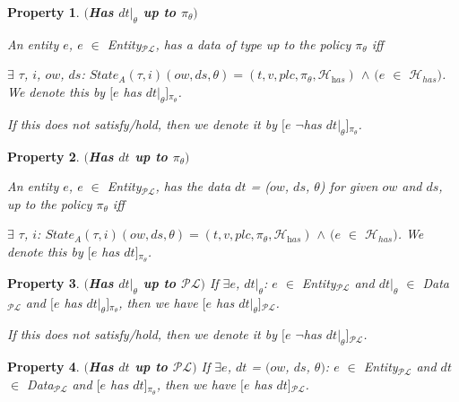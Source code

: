 \documentclass[a4paper]{article}
\newtheorem{ttp}{Property}
\begin{document}
\begin{ttp}\label{prop:has1}\textbf{$($Has $dt|_{\theta}$ up to $\pi_{\theta}$$)$}

An entity $e$, $e$ $\in$ \textit{Entity}$_{\mathcal{P}\mathcal{L}}$, has a data of type up to  the policy $\pi_{\theta}$ iff 

$\exists$ $\tau$, $i$, $ow$, $ds$: $\textit{State}_A(\tau, i)(ow, ds, \theta) = (t, v, \textit{plc}, \pi_{\theta}, \mathcal{H}_{\textit{has}})$ $\wedge$ $(e$ $\in$ $\mathcal{H}_{has})$. We denote this by $[e$ has $dt|_{\theta}]$$_{\pi_{\theta}}$. 

If this does not satisfy/hold, then we denote it by $[e$ $\neg$has $dt|_{\theta}]$$_{\pi_{\theta}}$. 
\end{ttp}

\begin{ttp}\label{prop:has2}\textbf{$($Has $dt$ up to $\pi_{\theta}$$)$}

An entity $e$, $e$ $\in$ \textit{Entity}$_{\mathcal{P}\mathcal{L}}$, has the data $dt$ = ($ow$, $ds$, $\theta$) for given $ow$ and $ds$, up to the policy $\pi_{\theta}$ iff  

$\exists$ $\tau$, $i$: $\textit{State}_A(\tau, i)(ow, ds, \theta) = (t, v, \textit{plc}, \pi_{\theta}, \mathcal{H}_{\textit{has}})$ $\wedge$ $(e$ $\in$ $\mathcal{H}_{has})$. We denote this by $[e$ has $dt]$$_{\pi_{\theta}}$.

\end{ttp}    

\begin{ttp}\label{prop:has3}\textbf{$($Has $dt|_{\theta}$ up to $\mathcal{P}\mathcal{L}$$)$}
If $\exists$$e$, $dt|_{\theta}$: $e$ $\in$ \textit{Entity}$_{\mathcal{P}\mathcal{L}}$ and $dt|_{\theta}$ $\in$ \textit{Data}$_{\mathcal{P}\mathcal{L}}$ and $[e$ has $dt|_{\theta}]$$_{\pi_{\theta}}$, then we have $[e$ has $dt|_{\theta}]$$_{\mathcal{P}\mathcal{L}}$.   

If this does not satisfy/hold, then we denote it by $[e$ $\neg$has $dt|_{\theta}]$$_{\mathcal{P}\mathcal{L}}$. 
\end{ttp}   


\begin{ttp}\label{prop:has4}\textbf{$($Has $dt$ up to $\mathcal{P}\mathcal{L}$$)$}
If $\exists$$e$, $dt$ = $(ow$, $ds$, $\theta)$: $e$ $\in$ \textit{Entity}$_{\mathcal{P}\mathcal{L}}$ and $dt$ $\in$ \textit{Data}$_{\mathcal{P}\mathcal{L}}$ and $[e$ has $dt]$$_{\pi_{\theta}}$, then we have $[e$ has $dt]$$_{\mathcal{P}\mathcal{L}}$.   
\end{ttp}   
\end{document}
